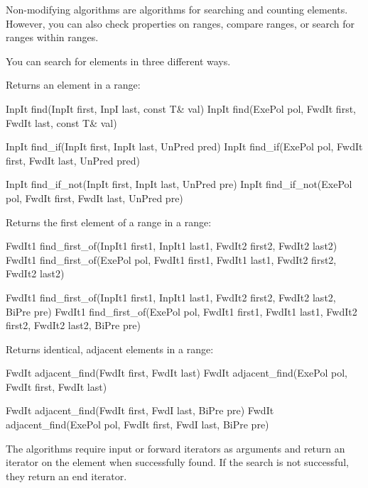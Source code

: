 Non-modifying algorithms are algorithms for searching and counting elements. However, you can also check properties on ranges, compare ranges, or search for ranges within ranges.


You can search for elements in three different ways.

Returns an element in a range:

\begin{cpp}
InpIt find(InpIt first, InpI last, const T& val)
InpIt find(ExePol pol, FwdIt first, FwdIt last, const T& val)

InpIt find_if(InpIt first, InpIt last, UnPred pred)
InpIt find_if(ExePol pol, FwdIt first, FwdIt last, UnPred pred)

InpIt find_if_not(InpIt first, InpIt last, UnPred pre)
InpIt find_if_not(ExePol pol, FwdIt first, FwdIt last, UnPred pre)
\end{cpp}

Returns the first element of a range in a range:

\begin{cpp}
FwdIt1 find_first_of(InpIt1 first1, InpIt1 last1,
					 FwdIt2 first2, FwdIt2 last2)
FwdIt1 find_first_of(ExePol pol, FwdIt1 first1, FwdIt1 last1,
					 FwdIt2 first2, FwdIt2 last2)
					 
FwdIt1 find_first_of(InpIt1 first1, InpIt1 last1,
					 FwdIt2 first2, FwdIt2 last2, BiPre pre)
FwdIt1 find_first_of(ExePol pol, FwdIt1 first1, FwdIt1 last1,
					 FwdIt2 first2, FwdIt2 last2, BiPre pre)
\end{cpp}

Returns identical, adjacent elements in a range:

\begin{cpp}
FwdIt adjacent_find(FwdIt first, FwdIt last)
FwdIt adjacent_find(ExePol pol, FwdIt first, FwdIt last)

FwdIt adjacent_find(FwdIt first, FwdI last, BiPre pre)
FwdIt adjacent_find(ExePol pol, FwdIt first, FwdI last, BiPre pre)
\end{cpp}

The algorithms require input or forward iterators as arguments and return an iterator on the element when successfully found. If the search is not successful, they return an end iterator.


